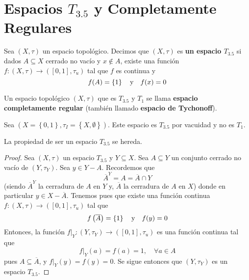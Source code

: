 \documentclass[12pt]{report}
\theoremstyle{largebreak}
\newcommand\cf[3]{\ensuremath{#1:#2\rightarrow#3}}
\begin{document}
    \section{Espacios $T_{3.5}$ y Completamente Regulares}

    \begin{mydef}
        Sea $(X,\tau)$ un espacio topológico. Decimos que $(X,\tau)$ es \textbf{un espacio $T_{ 3.5}$} si dados $A\subseteq X$ cerrado no vacío y $x\notin A$, existe una función $\cf{f}{(X,\tau)}{([0,1],\tau_u)}$ tal que $f$ es continua y
        \begin{equation*}
            f(A)=\left\{1\right\}\quad\textup{y}\quad f(x)=0
        \end{equation*}
    \end{mydef}

    \begin{mydef}
        Un espacio topológico $(X,\tau)$ que es $T_{3.5}$ y $T_1$ se llama \textbf{espacio completamente regular} (también llamado \textbf{espacio de Tychonoff}).
    \end{mydef}

    \begin{exa}
        Sea $(X=\left\{0,1\right\},\tau_I=\left\{X,\emptyset \right\})$. Este espacio es $T_{3.5}$ por vacuidad y no es $T_1$.
    \end{exa}

    \begin{propo}
        La propiedad de ser un espacio $T_{3.5}$ se hereda.
    \end{propo}

    \begin{proof}
        Sea $(X,\tau)$ un espacio $T_{3.5}$ y $Y\subseteq X$. Sea $A\subseteq Y$ un conjunto cerrado no vacío de $(Y,\tau_Y)$. Sea $y\in Y-A$. Recordemos que
        \begin{equation*}
            \overline{A}^Y=A=\overline{A}\cap Y
        \end{equation*}
        (siendo $\overline{A}^Y$ la cerradura de $A$ en $Y$ y, $\overline{A}$ la cerradura de $A$ en $X$) donde en particular $y\in X-\overline{A}$. Tenemos pues que existe una función continua $\cf{f}{(X,\tau)}{([0,1],\tau_u)}$ tal que
        \begin{equation*}
            f\left(\overline{A}\right)=\left\{1\right\}\quad\textup{y}\quad f(y)=0
        \end{equation*}
        Entonces, la función $\cf{f\big|_{Y}}{(Y,\tau_Y)}{([0,1],\tau_u)}$ es una función continua tal que
        \begin{equation*}
            f\big|_{Y}(a)=f(a)=1,\quad\forall a\in A
        \end{equation*}
        pues $A\subseteq\overline{A}$, y $f\big|_{Y}(y)=f(y)=0$. Se sigue entonces que $(Y,\tau_Y)$ es un espacio $T_{3.5}$.
    \end{proof}
\end{document}
